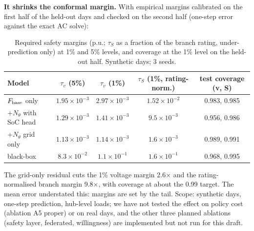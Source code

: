 \documentclass[10pt]{article}
\begin{document}
\textbf{It shrinks the conformal margin.} With empirical margins calibrated on the first half of the held-out days and checked on the second half (one-step error against the exact AC solve):
\begin{table}[h]\centering\small\begin{tabular}{lcccc}
Model & $\tau_v$ (5\%) & $\tau_v$ (1\%) & $\tau_S$ (1\%, rating-norm.) & test coverage (v, S)\\\hline
$F_{\rm base}$ only & $1.95\times10^{-3}$ & $2.97\times10^{-3}$ & $1.52\times10^{-2}$ & 0.983, 0.985\\
$+N_\theta$ with SoC head & $1.29\times10^{-3}$ & $1.41\times10^{-3}$ & $9.5\times10^{-3}$ & 0.956, 0.986\\
$+N_\theta$ grid only & $1.13\times10^{-3}$ & $1.14\times10^{-3}$ & $1.6\times10^{-3}$ & 0.989, 0.991\\
black-box & $8.3\times10^{-2}$ & $1.1\times10^{-1}$ & $1.6\times10^{-1}$ & 0.968, 0.995
\end{tabular}\caption{Required safety margins (p.u.; $\tau_S$ as a fraction of the branch rating, under-prediction only) at 1\% and 5\% levels, and coverage at the 1\% level on the held-out half. Synthetic days; 3 seeds.}\label{tab:wm2}\end{table}
The grid-only residual cuts the 1\% voltage margin 2.6$\times$ and the rating-normalised branch margin 9.8$\times$, with coverage at about the 0.99 target. The mean error understated this: margins are set by the tail. Scope: synthetic days, one-step prediction, hub-level loads; we have not tested the effect on policy cost (ablation A5 proper) or on real days, and the other three planned ablations (safety layer, federated, willingness) are implemented but not run for this draft.
\end{document}
